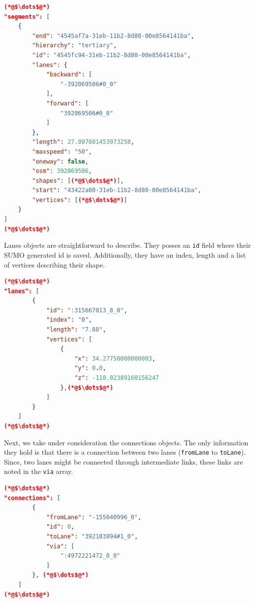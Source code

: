 \begin{scriptsize}
        \begin{lstlisting}[language=json,firstnumber=1,caption={General overview of the segments key in the JSON export format.},label={lis:format-lanes}]
(*@$\dots$@*)
"segments": [
    {
        "end": "4545af7a-31eb-11b2-8d80-00e8564141ba",
        "hierarchy": "tertiary",
        "id": "4545fc94-31eb-11b2-8d80-00e8564141ba",
        "lanes": {
            "backward": [
                "-392069506#0_0"
            ],
            "forward": [
                "392069506#0_0"
            ]
        },
        "length": 27.097801453973258,
        "maxspeed": "50",
        "oneway": false,
        "osm": 392069506,
        "shapes": [(*@$\dots$@*)],
        "start": "43422a00-31eb-11b2-8d80-00e8564141ba",
        "vertices": [(*@$\dots$@*)]
    }
]           
(*@$\dots$@*)
	   \end{lstlisting}
    \end{scriptsize}

Lanes objects are straightforward to describe. They posses an \texttt{id} field where their SUMO generated id is saved. Additionally, they have an index, length and a list of vertices describing their shape.\\
 
\begin{scriptsize}
        \begin{lstlisting}[language=json,firstnumber=1,caption={General overview of the lanes key in the JSON export format.},label={lis:format-node}]
(*@$\dots$@*)
"lanes": [
        {
            "id": ":315667013_8_0",
            "index": "0",
            "length": "7.88",
            "vertices": [
                {
                    "x": 34.27750000000003,
                    "y": 0.0,
                    "z": -110.02389160156247
                },(*@$\dots$@*)
            ]
        }
    ]
(*@$\dots$@*)
	   \end{lstlisting}
    \end{scriptsize}
    
Next, we take under consideration the connections objects. The only information they hold is that there is a connection between two lanes (\texttt{fromLane} to \texttt{toLane}). Since, two lanes might be connected through intermediate links, these links are noted in the \texttt{via} array.\\
    
    \begin{scriptsize}
        \begin{lstlisting}[language=json,firstnumber=1,caption={General overview of the connection key in the JSON export format.},label={lis:format-node}]
(*@$\dots$@*)
"connections": [
        {
            "fromLane": "-155040996_0",
            "id": 0,
            "toLane": "392103894#1_0",
            "via": [
                ":4972221472_0_0"
            ]
        }, (*@$\dots$@*)
    ]
(*@$\dots$@*)
	   \end{lstlisting}
    \end{scriptsize}
    
